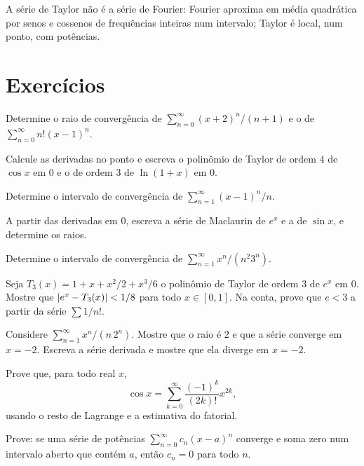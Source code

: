 \documentclass[11pt,a4paper]{article}
\begin{document}
A série de Taylor não é a série de Fourier: Fourier aproxima em média quadrática por senos e cossenos de frequências inteiras num intervalo; Taylor é local, num ponto, com potências.

\section{Exercícios}

\begin{exercicio}
Determine o raio de convergência de \(\sum_{n=0}^\infty (x+2)^n/(n+1)\) e o de \(\sum_{n=0}^\infty n!(x-1)^n\).
\end{exercicio}

\begin{exercicio}
Calcule as derivadas no ponto e escreva o polinômio de Taylor de ordem \(4\) de \(\cos x\) em \(0\) e o de ordem \(3\) de \(\ln(1+x)\) em \(0\).
\end{exercicio}

\begin{exercicio}
Determine o intervalo de convergência de \(\sum_{n=1}^\infty (x-1)^n/n\).
\end{exercicio}

\begin{exercicio}
A partir das derivadas em \(0\), escreva a série de Maclaurin de \(e^x\) e a de \(\sin x\), e determine os raios.
\end{exercicio}

\begin{exercicio}
Determine o intervalo de convergência de \(\sum_{n=1}^\infty x^n/(n^2 3^n)\).
\end{exercicio}

\begin{exercicio}
Seja \(T_3(x)=1+x+x^2/2+x^3/6\) o polinômio de Taylor de ordem \(3\) de \(e^x\) em \(0\). Mostre que \(\left\lvert e^x-T_3(x) \right\rvert<1/8\) para todo \(x\in[0,1]\). Na conta, prove que \(e<3\) a partir da série \(\sum 1/n!\).
\end{exercicio}

\begin{exercicio}
Considere \(\sum_{n=1}^\infty x^n/(n\,2^n)\). Mostre que o raio é \(2\) e que a série converge em \(x=-2\). Escreva a série derivada e mostre que ela diverge em \(x=-2\).
\end{exercicio}

\begin{exercicio}
Prove que, para todo real \(x\),
\[
\cos x=\sum_{k=0}^\infty\frac{(-1)^k}{(2k)!}x^{2k},
\]
usando o resto de Lagrange e a estimativa do fatorial.
\end{exercicio}

\begin{exercicio}
Prove: se uma série de potências \(\sum_{n=0}^\infty c_n(x-a)^n\) converge e soma zero num intervalo aberto que contém \(a\), então \(c_n=0\) para todo \(n\).
\end{exercicio}
\end{document}
